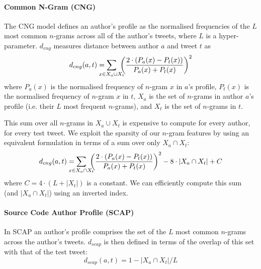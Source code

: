 \documentclass[twocolumn,10pt]{article}
\begin{document}
\paragraph{Common N-Gram (CNG)}
The CNG model\supercite{kevselj2003n} defines an author's profile
as the normalised frequencies of the $L$ most common $n$-grams
across all of the author's tweets, where $L$ is a hyper-parameter.
$d_{cng}$ measures distance between author $a$ and tweet $t$ as
$$
d_{cng}(a, t) =
    \smashoperator{\sum_{x \in X_a \cup X_t}}\ 
        {\left ( \frac{2 \cdot (P_a(x) - P_t(x))}{P_a(x) + P_t(x)} \right )}^2
$$
where $P_a(x)$ is the normalised frequency of $n$-gram $x$ in
$a$'s profile, $P_t(x)$ is the normalised frequency of $n$-gram
$x$ in $t$, $X_a$ is the set of $n$-grams in author $a$'s profile
(i.e. their $L$ most frequent $n$-grams), and $X_t$ is the set
of $n$-grams in $t$.

This sum over all $n$-grams in $X_a \cup X_t$ is expensive
to compute for every author, for every test tweet.
We exploit the sparsity of our $n$-gram features by using
an equivalent formulation in terms of a sum over only
$X_a \cap X_t$:
$$
d_{cng} (a, t) =
    \smashoperator{\sum_{x \in X_a \cap X_t}}\ 
        {\left ( \frac{2 \cdot (P_a(x) - P_t(x))}{P_a(x) + P_t(x)} \right )}^2
        - 8 \cdot |X_a \cap X_t| + C
$$
where $C=4 \cdot (L + |X_t|)$ is a constant.
We can efficiently compute this sum (and $|X_a \cap X_t|$)
using an inverted index.


\paragraph{Source Code Author Profile (SCAP)} In SCAP\supercite{frantzeskou2006effective}
an author's profile comprises the set of the $L$ most common
$n$-grams across the author's tweets. $d_{scap}$ is then defined in
terms of the overlap of this set with that of the test tweet:
$$
d_{scap}(a, t) = 1 - |X_a \cap X_t| / L     %
$$
\end{document}
